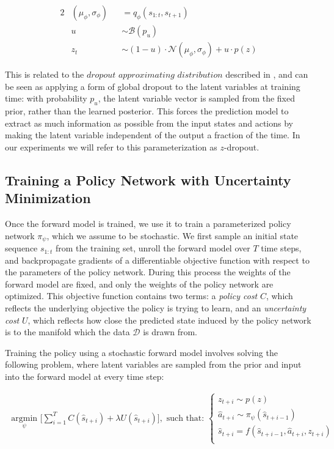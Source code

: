 \documentclass{article} %
\begin{document}
\begin{alignat}{2}
  \label{eq:update-eqn}
  &(\mu_\phi, \sigma_\phi) &&= q_\phi(s_{1:t}, s_{t+1}) \\
  &u &&\sim \mathcal{B}(p_u) \\
  &z_t &&\sim (1-u) \cdot \mathcal{N}(\mu_\phi, \sigma_\phi) + u \cdot p(z)
\end{alignat}

This is related to the $\textit{dropout approximating distribution}$ described in \citep{Gal16}, and can be seen as applying a form of global dropout to the latent variables at training time: with probability $p_u$, the latent variable vector is sampled from the fixed prior, rather than the learned posterior.
This forces the prediction model to extract as much information as possible from the input states and actions by making the latent variable independent of the output a fraction of the time. In our experiments we will refer to this parameterization as $z$-dropout. 


\subsection{Training a Policy Network with Uncertainty Minimization}
\label{uncertainty-minimization}

Once the forward model is trained, we use it to train a parameterized policy network $\pi_\psi$, which we assume to be stochastic.
We first sample an initial state sequence $s_{1:t}$ from the training set, unroll the forward model over $T$ time steps, and backpropagate gradients of a differentiable objective function with respect to the parameters of the policy network.
During this process the weights of the forward model are fixed, and only the weights of the policy network are optimized.
This objective function contains two terms: a \textit{policy cost} $C$, which reflects the underlying objective the policy is trying to learn, and an \textit{uncertainty cost} $U$, which reflects how close the predicted state induced by the policy network is to the manifold which the data $\mathcal{D}$ is drawn from.

Training the policy using a stochastic forward model involves solving the following problem, where latent variables are sampled from the prior and input into the forward model at every time step:

        \begin{align*}
    \underset{\psi}{\mbox{ argmin }} \Big[ \sum_{i=1}^{T} C(\hat{s}_{t+i}) + \lambda U(\hat{s}_{t+i}) \Big],  \mbox{ such that: }
    \begin{cases}
      z_{t+i} \sim p(z) \\
      \hat{a}_{t+i} \sim \pi_\psi(\hat{s}_{t+i-1}) \\
      \hat{s}_{t+i} = f(\hat{s}_{t+i-1}, \hat{a}_{t+i}, z_{t+i}) \\
      \end{cases}
        \end{align*}
\end{document}
